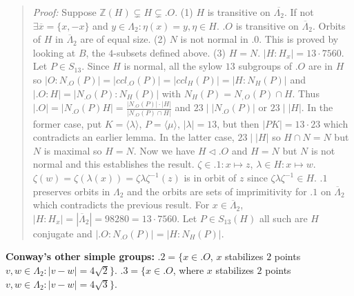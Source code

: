 \begin{quote}
\emph{Proof:} 
Suppose ${\mathbb Z}(H) \subsetneq H \subsetneq .O$.  
(1) $H$ is transitive on ${\overline {\Lambda_2}}$.
If not $\exists {\overline x}= \{x, -x\}$
and $y \in \Lambda_2: \eta(x)= y, \eta \in H$.  $.O$ is transitive on
${\overline {\Lambda}}_2$.  Orbits of $H$ in ${\overline {\Lambda}}_2$ are of
equal size.
(2) $N$ is not normal in $.0$.  This is proved by looking at $B$, the $4$-subsets defined above.
(3) $H=N$.  $|H:H_x|= 13 \cdot 7560$.  Let $P \in S_{13}$.  Since $H$ is normal, all the sylow $13$
subgroups of $.O$ are in $H$ so
$|O:N_{.O}(P)| = |ccl_{.O}(P)|=
|ccl_{H}(P)|= |H:N_H(P)|$ and $|.O:H|= |N_{.O}(P):N_H(P)|$ with $N_H(P)= N_{,O}(P) \cap H$.
Thus $|.O|= |N_{.O}(P)H|= {\frac
{|N_{.O}(P)| \cdot |H|}
{|N_{.O}(P) \cap H|}}$ and
$23 \mid |N_{.O}(P)|$ or $23 \mid |H|$.  In the former case, put
$K= \langle \lambda \rangle$,
$P= \langle \mu \rangle$, $|\lambda|= 13$, but then $|PK|=13 \cdot 23$ which contradicts an
earlier lemma.  In the latter case,  $23 \mid |H|$ so $H \cap N = N$ but $N$ is maximal so
$H=N$.
Now we have $H \lhd .O$ and $H=N$ but $N$ is not normal and this establishes the result.
$\zeta \in .1: x \mapsto z$,
$\lambda \in H: x \mapsto w$.
$\zeta(w)= \zeta(\lambda(x))= \zeta \lambda \zeta^{-1}(z)$ is in orbit of $z$
since $\zeta \lambda \zeta^{-1} \in H$.  $.1$ preserves orbits in
$\Lambda_2$ and the orbits are sets of imprimitivity for $.1$ on
${\overline {\Lambda}}_2$ which contradicts the previous result.
For $x \in {\overline {\Lambda}}_2$, 
$|H:H_x|=|{\overline {\Lambda}}_2| = 98280= 13 \cdot 7560$.
Let $P \in S_{13}(H)$ all such are $H$ conjugate and
$|.O:N_{.O}(P)|= |H:N_H(P)|$.
\end{quote}
{\bf Conway's other simple groups:} 
$.2= \{ x \in .O$, $x$ stabilizes
$2$ points $v,w \in \Lambda_2: |v-w|= 4 {\sqrt 2} \}$.
$.3= \{ x \in .O$, where $x$ stabilizes
$2$ points $v,w \in \Lambda_2: |v-w|= 4 {\sqrt 3} \}$.
